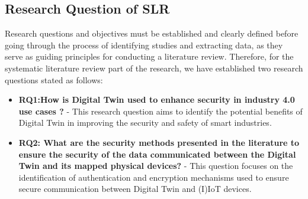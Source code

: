 
\subsection{Research Question of SLR}
Research questions and objectives must be established and clearly defined before going through the process of identifying studies and extracting data, as they serve as guiding principles for conducting a literature review\cite{carrera-rivera_how-conduct_2022}. Therefore, for the systematic literature review part of the research, we have established two research questions stated as follows:

\begin{itemize}

    \item \textbf{RQ1:How is Digital Twin used to enhance security in industry 4.0 use cases ?} - This research question aims to identify the potential benefits of Digital Twin in improving the security and safety of smart industries.
 
    \item \textbf{RQ2: What are the security methods presented in the literature to ensure the security of the data communicated between the Digital Twin and its mapped physical devices?} - This question focuses on the identification of authentication and encryption mechanisms used to ensure secure communication between Digital Twin and (I)IoT devices.
\end{itemize}